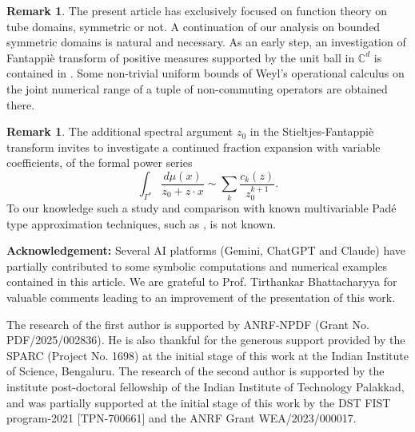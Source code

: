\documentclass[11pt,reqno]{amsart}
\theoremstyle{plain}
\theoremstyle{definition}
\newtheorem{remark}[theorem]{Remark}
\numberwithin{equation}{section}
\begin{document}
\begin{remark} The present article has exclusively focused on function theory on tube domains, symmetric or not. A continuation of our analysis on bounded symmetric domains is natural and necessary. As an early step, an investigation of Fantappi\`e transform of positive measures supported by the unit ball in ${\mathbb C}^d$ is contained in \cite{McCP}. Some non-trivial uniform bounds of Weyl's operational calculus on the joint numerical range of a tuple of non-commuting operators are obtained there.

\end{remark}

\begin{remark} The additional spectral argument $z_0$ in the Stieltjes-Fantappi\`e transform invites to investigate a continued fraction expansion with variable coefficients, of the formal power series
$$ \int_{\Gamma^\ast}\frac{d\mu(x)}{z_0 + z\cdot x} \sim \sum_k \frac{c_k(z)}{z_0^{k+1}}.$$
To our knowledge such a study and comparison with known multivariable Pad\'e type approximation techniques, such as \cite{Guillaume-Huard}, is not known.


\end{remark}




\noindent \textbf{Acknowledgement:} Several AI platforms (Gemini, ChatGPT and Claude) have partially contributed to some symbolic computations and numerical examples contained in this article. We are grateful to Prof. Tirthankar Bhattacharyya for valuable comments leading to an improvement of the presentation of this work.

The research of the first author is supported by ANRF-NPDF (Grant No. PDF/2025/002836).
He is also thankful for the generous support provided by the SPARC (Project No. 1698) at the initial stage of this work at the Indian Institute of Science, Bengaluru. The research of the second author is supported by the institute post-doctoral fellowship of the Indian Institute of Technology Palakkad, and was partially supported at the initial stage of this work by the DST FIST program-2021 [TPN-700661] and the ANRF Grant WEA/2023/000017.
 




	
	
\end{document}
